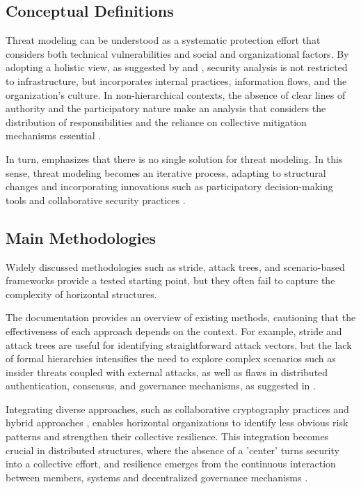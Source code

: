 \subsection{Conceptual Definitions}
\label{subsec:conceptual_definitions}

Threat modeling can be understood as a systematic protection effort that
considers both technical vulnerabilities and social and organizational factors.
By adopting a holistic view, as suggested by
\cite{ThreatModelingAsABasisForSecurityRequirements} and
\cite{AdvancedThreatModeling}, security analysis is not restricted to
infrastructure, but incorporates internal practices, information flows, and the
organization's culture. In non-hierarchical contexts, the absence of clear lines
of authority and the participatory nature make an analysis that considers the
distribution of responsibilities and the reliance on collective mitigation
mechanisms essential \cite{Colbac}.

In turn, \cite{DemystifyingTheThreatModelingProcess} emphasizes that there is no
single solution for threat modeling. In this sense, threat modeling becomes an
iterative process, adapting to structural changes and incorporating innovations
such as participatory decision-making tools and collaborative security practices
\cite{SecurityCardsToolkit, ParticipatoryThreatModelling}.

\subsection{Main Methodologies}
\label{subsec:main_methodologies}

Widely discussed methodologies such as \gls{stride}, attack trees, and
scenario-based frameworks \cite{EvaluationofCompetingThreatModeling} provide a
tested starting point, but they often fail to capture the complexity of
horizontal structures.

The documentation \cite{ThreatModelingASummaryOfAvailableMethods} provides an
overview of existing methods, cautioning that the effectiveness of each approach
depends on the context. For example, \gls{stride} and attack trees are useful
for identifying straightforward attack vectors, but the lack of formal
hierarchies intensifies the need to explore complex scenarios such as insider
threats coupled with external attacks, as well as flaws in distributed
authentication, consensus, and governance mechanisms, as suggested in
\cite{Colbac, AttackTrees, STRIDEthreatmodelingforcyberphysical}.

Integrating diverse approaches, such as collaborative cryptography practices
\cite{AbcCrypto} and hybrid approaches \cite{CoReTM}, enables horizontal
organizations to identify less obvious risk patterns and strengthen their
collective resilience. This integration becomes crucial in distributed
structures, where the absence of a 'center' turns security into a collective
effort, and resilience emerges from the continuous interaction between members,
systems and decentralized governance mechanisms \cite{Reputation-basedDAO}.

